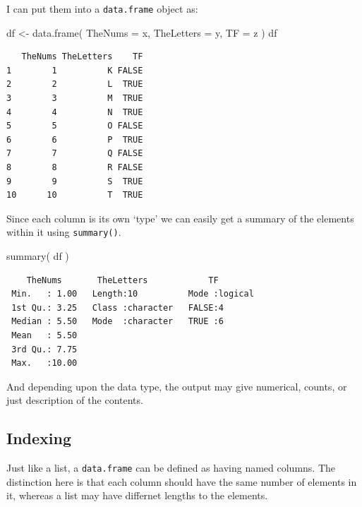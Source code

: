\documentclass[
  letterpaper,
]{book}
\newenvironment{Shaded}{\begin{snugshade}}{\end{snugshade}}
\newcommand{\AttributeTok}[1]{\textcolor[rgb]{0.40,0.45,0.13}{#1}}
\newcommand{\FunctionTok}[1]{\textcolor[rgb]{0.28,0.35,0.67}{#1}}
\newcommand{\NormalTok}[1]{\textcolor[rgb]{0.00,0.23,0.31}{#1}}
\newcommand{\OtherTok}[1]{\textcolor[rgb]{0.00,0.23,0.31}{#1}}
\begin{document}
I can put them into a \texttt{data.frame} object as:

\begin{Shaded}
\begin{Highlighting}[]
\NormalTok{df }\OtherTok{\textless{}{-}} \FunctionTok{data.frame}\NormalTok{( }\AttributeTok{TheNums =}\NormalTok{ x,}
                  \AttributeTok{TheLetters =}\NormalTok{ y,}
                  \AttributeTok{TF =}\NormalTok{ z}
\NormalTok{                  )}
\NormalTok{df}
\end{Highlighting}
\end{Shaded}

\begin{verbatim}
   TheNums TheLetters    TF
1        1          K FALSE
2        2          L  TRUE
3        3          M  TRUE
4        4          N  TRUE
5        5          O FALSE
6        6          P  TRUE
7        7          Q FALSE
8        8          R FALSE
9        9          S  TRUE
10      10          T  TRUE
\end{verbatim}

Since each column is its own `type' we can easily get a summary of the
elements within it using \texttt{summary()}.

\begin{Shaded}
\begin{Highlighting}[]
\FunctionTok{summary}\NormalTok{( df )}
\end{Highlighting}
\end{Shaded}

\begin{verbatim}
    TheNums       TheLetters            TF         
 Min.   : 1.00   Length:10          Mode :logical  
 1st Qu.: 3.25   Class :character   FALSE:4        
 Median : 5.50   Mode  :character   TRUE :6        
 Mean   : 5.50                                     
 3rd Qu.: 7.75                                     
 Max.   :10.00                                     
\end{verbatim}

And depending upon the data type, the output may give numerical, counts,
or just description of the contents.

\subsection{Indexing}\label{indexing-2}

Just like a list, a \texttt{data.frame} can be defined as having named
columns. The distinction here is that each column should have the same
number of elements in it, whereas a list may have differnet lengths to
the elements.
\end{document}
